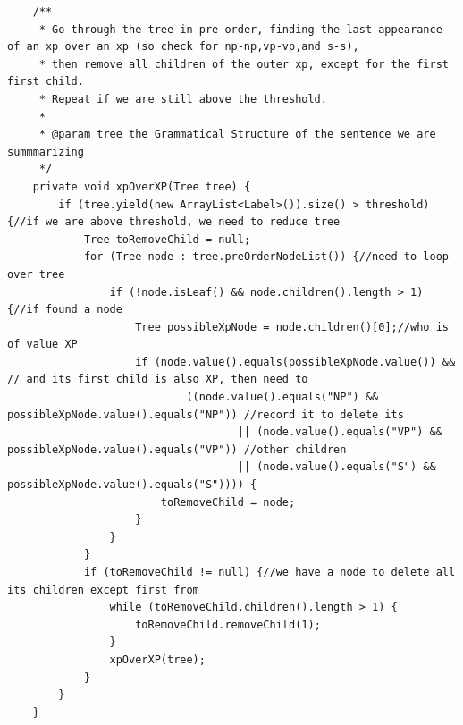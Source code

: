 \begin{lstlisting}
    /**
     * Go through the tree in pre-order, finding the last appearance of an xp over an xp (so check for np-np,vp-vp,and s-s),
     * then remove all children of the outer xp, except for the first first child.
     * Repeat if we are still above the threshold.
     *
     * @param tree the Grammatical Structure of the sentence we are summmarizing
     */
    private void xpOverXP(Tree tree) {
        if (tree.yield(new ArrayList<Label>()).size() > threshold) {//if we are above threshold, we need to reduce tree
            Tree toRemoveChild = null;
            for (Tree node : tree.preOrderNodeList()) {//need to loop over tree
                if (!node.isLeaf() && node.children().length > 1) {//if found a node
                    Tree possibleXpNode = node.children()[0];//who is of value XP
                    if (node.value().equals(possibleXpNode.value()) && // and its first child is also XP, then need to
                            ((node.value().equals("NP") && possibleXpNode.value().equals("NP")) //record it to delete its
                                    || (node.value().equals("VP") && possibleXpNode.value().equals("VP")) //other children
                                    || (node.value().equals("S") && possibleXpNode.value().equals("S")))) {
                        toRemoveChild = node;
                    }
                }
            }
            if (toRemoveChild != null) {//we have a node to delete all its children except first from
                while (toRemoveChild.children().length > 1) {
                    toRemoveChild.removeChild(1);
                }
                xpOverXP(tree);
            }
        }
    }


\end{lstlisting}
